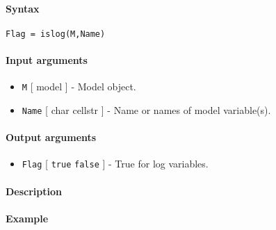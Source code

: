 


	\paragraph{Syntax}

\begin{verbatim}
Flag = islog(M,Name)
\end{verbatim}

\paragraph{Input arguments}

\begin{itemize}
\item
  \texttt{M} {[} model {]} - Model object.
\item
  \texttt{Name} {[} char \textbar{} cellstr {]} - Name or names of model
  variable(s).
\end{itemize}

\paragraph{Output arguments}

\begin{itemize}
\itemsep1pt\parskip0pt
\item
  \texttt{Flag} {[} \texttt{true} \textbar{} \texttt{false} {]} - True
  for log variables.
\end{itemize}

\paragraph{Description}

\paragraph{Example}


